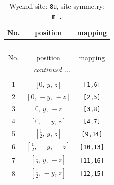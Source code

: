\documentclass[fleqn,8pt]{jsarticle}
\begin{document}
\renewcommand{\arraystretch}{1.2}
\begin{longtable}{ccc}
\caption{Wyckoff site: {\tt 8u}, site symmetry: {\tt m..}}
 \\
 \hline \hline
No. & position & mapping \\ \hline \endfirsthead

\multicolumn{2}{l}{\tablename\ \thetable{}} \\
 \hline \hline
No. & position & mapping \\ \hline \endhead

 \hline \hline
\multicolumn{2}{r}{\footnotesize\it continued ...} \\ \endfoot

 \hline \hline
\multicolumn{2}{r}{} \\ \endlastfoot

1 & $\left[ 0,\, y,\, z \right]$ & {\tt [1,6]} \\ \hline
2 & $\left[ 0,\, - y,\, - z \right]$ & {\tt [2,5]} \\ \hline
3 & $\left[ 0,\, y,\, - z \right]$ & {\tt [3,8]} \\ \hline
4 & $\left[ 0,\, - y,\, z \right]$ & {\tt [4,7]} \\ \hline
5 & $\left[ \frac{1}{2},\, y,\, z \right]$ & {\tt [9,14]} \\ \hline
6 & $\left[ \frac{1}{2},\, - y,\, - z \right]$ & {\tt [10,13]} \\ \hline
7 & $\left[ \frac{1}{2},\, y,\, - z \right]$ & {\tt [11,16]} \\ \hline
8 & $\left[ \frac{1}{2},\, - y,\, z \right]$ & {\tt [12,15]} \\
\end{longtable}
\renewcommand{\arraystretch}{1.2}
\end{document}
